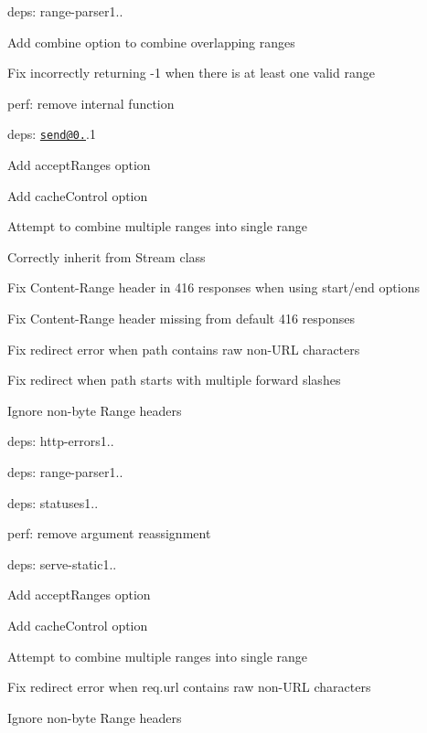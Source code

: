 \begin{DoxyItemize}
\begin{DoxyItemize}
\end{DoxyItemize}
\item deps\+: range-\/parser1..
\begin{DoxyItemize}
\item Add {\ttfamily combine} option to combine overlapping ranges
\item Fix incorrectly returning -\/1 when there is at least one valid range
\item perf\+: remove internal function
\end{DoxyItemize}
\item deps\+: \href{mailto:send@0.14}{\tt send@0.}.1
\begin{DoxyItemize}
\item Add {\ttfamily accept\+Ranges} option
\item Add {\ttfamily cache\+Control} option
\item Attempt to combine multiple ranges into single range
\item Correctly inherit from {\ttfamily Stream} class
\item Fix {\ttfamily Content-\/\+Range} header in 416 responses when using {\ttfamily start}/{\ttfamily end} options
\item Fix {\ttfamily Content-\/\+Range} header missing from default 416 responses
\item Fix redirect error when {\ttfamily path} contains raw non-\/\+U\+RL characters
\item Fix redirect when {\ttfamily path} starts with multiple forward slashes
\item Ignore non-\/byte {\ttfamily Range} headers
\item deps\+: http-\/errors1..
\item deps\+: range-\/parser1..
\item deps\+: statuses1..
\item perf\+: remove argument reassignment
\end{DoxyItemize}
\item deps\+: serve-\/static1..
\begin{DoxyItemize}
\item Add {\ttfamily accept\+Ranges} option
\item Add {\ttfamily cache\+Control} option
\item Attempt to combine multiple ranges into single range
\item Fix redirect error when {\ttfamily req.\+url} contains raw non-\/\+U\+RL characters
\item Ignore non-\/byte {\ttfamily Range} headers

\end{DoxyItemize}
\end{DoxyItemize}
